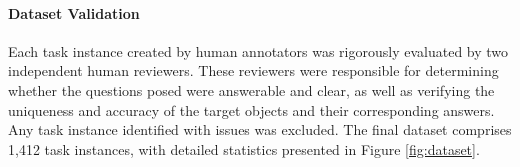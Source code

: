 \paragraph{Dataset Validation} 

Each task instance created by human annotators was rigorously evaluated by two independent human reviewers. These reviewers were responsible for determining whether the questions posed were answerable and clear, as well as verifying the uniqueness and accuracy of the target objects and their corresponding answers. Any task instance identified with issues was excluded. The final dataset comprises 1,412 task instances, with detailed statistics presented in Figure \ref{fig:dataset}.




